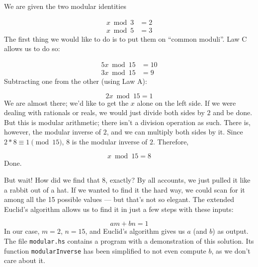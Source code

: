 \documentclass{article}
\begin{document}
We are given the two modular identities

\begin{align*}
x \bmod 3 &= 2 \\
x \bmod 5 &= 3
\end{align*}
The first thing we would like to do is to put them on ``common moduli''.
Law C allows us to do so:

\begin{align*}
5 x \bmod 15 &= 10 \\
3 x \bmod 15 &= 9
\end{align*}
Subtracting one from the other (using Law A):

\begin{equation*}
2 x \bmod 15 = 1
\end{equation*}
We are almost there; we'd like to get the $x$ alone on the left side.
If we were dealing with rationals or reals, we would just divide both sides by $2$ and be done.
But this is modular arithmetic; there isn't a division operation as such.
There is, however, the modular inverse of $2$, and we can multiply both sides by it.
Since $2 * 8 \equiv 1 \pmod{15}$, $8$ is the modular inverse of $2$.
Therefore,

\begin{equation*}
x \bmod 15 = 8
\end{equation*}
Done.

But wait!
How did we find that $8$, exactly?
By all accounts, we just pulled it like a rabbit out of a hat.
If we wanted to find it the hard way, we could scan for it among all the 15 possible values --- but that's not so elegant.
The extended Euclid's algorithm allows us to find it in just a few steps with these inputs:

\begin{equation*}
a m + b n = 1
\end{equation*}
In our case, $m = 2$, $n = 15$, and Euclid's algorithm gives us $a$ (and $b$) as output.
The file \texttt{modular.hs} contains a program with a demonstration of this solution.
Its function \texttt{modularInverse} has been simplified to not even compute $b$, as we don't care about it.
\end{document}
